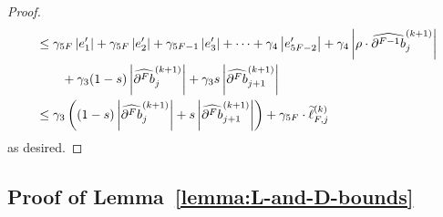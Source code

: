 \begin{proof}
\begin{align}
&\leq \gamma_{5F} \left|e_1'\right| + \gamma_{5F} \left|e_2'\right| +
  \gamma_{5F - 1} \left|e_3'\right| + \cdots +
  \gamma_4 \left|e_{5F - 2}'\right| +
  \gamma_4 \left|\rho \cdot \cdb{F - 1}_j^{(k + 1)}\right| \\
&\qquad + \gamma_3 (1 - s) \left|
  \cdb{F}_j^{(k + 1)}\right| + \gamma_3 s \left|
  \cdb{F}_{j + 1}^{(k + 1)}\right| \\
&\leq \gamma_3 \left(
  (1 - s) \left|\cdb{F}_j^{(k + 1)}\right| +
  s \left|\cdb{F}_{j + 1}^{(k + 1)}\right|\right) +
  \gamma_{5F} \cdot \widetilde{\ell}_{F, j}^{(k)}
\end{align}
as desired.
\end{proof}

\subsection{Proof of Lemma~\ref{lemma:L-and-D-bounds}}
\label{proof:L-and-D-bounds}

